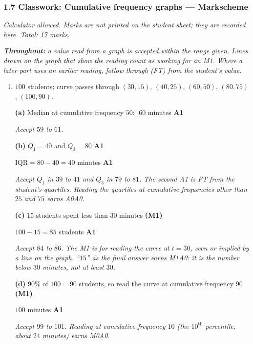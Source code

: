 \documentclass[12pt, twoside]{article}
\begin{document}
\subsubsection*{1.7 Classwork: Cumulative frequency graphs --- Markscheme}

\emph{Calculator allowed. Marks are not printed on the student sheet; they are
recorded here. Total: 17 marks.}

\emph{\textbf{Throughout:} a value read from a graph is accepted within the
range given. Lines drawn on the graph that show the reading count as working
for an M1. Where a later part uses an earlier reading, follow through (FT)
from the student's value.}

\begin{enumerate}[itemsep=0.3cm]

\item[1.] [Maximum mark: 9]

$100$ students; curve passes through $(30, 15)$, $(40, 25)$, $(60, 50)$,
$(80, 75)$, $(100, 90)$.

\textbf{(a)} Median at cumulative frequency $50$: $\;60$ minutes
\hfill \textbf{A1}

\emph{Accept $59$ to $61$.}

\textbf{(b)} $Q_{1} = 40$ and $Q_{3} = 80$ \hfill \textbf{A1}

$\text{IQR} = 80 - 40 = 40$ minutes \hfill \textbf{A1}

\emph{Accept $Q_{1}$ in $39$ to $41$ and $Q_{3}$ in $79$ to $81$. The second
A1 is FT from the student's quartiles. Reading the quartiles at cumulative
frequencies other than $25$ and $75$ earns A0A0.}

\textbf{(c)} $15$ students spent less than $30$ minutes \hfill
\textbf{(M1)}

$100 - 15 = 85$ students \hfill \textbf{A1}

\emph{Accept $84$ to $86$. The M1 is for reading the curve at $t = 30$,
seen or implied by a line on the graph. ``$15$'' as the final answer earns
M1A0: it is the number below $30$ minutes, not at least $30$.}

\textbf{(d)} $90\%$ of $100 = 90$ students, so read the curve at cumulative
frequency $90$ \hfill \textbf{(M1)}

$100$ minutes \hfill \textbf{A1}

\emph{Accept $99$ to $101$. Reading at cumulative frequency $10$ (the
$10^{\text{th}}$ percentile, about $24$ minutes) earns M0A0.}


\end{enumerate}
\end{document}
